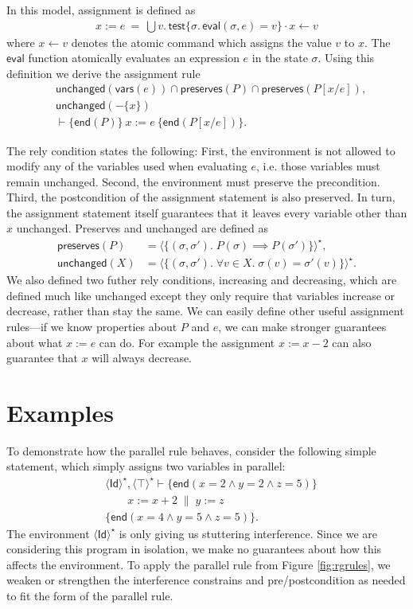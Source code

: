 \documentclass{llncs}
\newcommand{\test}{\mathsf{test}}
\newcommand{\eval}{\mathsf{eval}}
\newcommand{\Id}{\mathsf{Id}}
\newcommand{\edn}{\mathsf{end}}
\newcommand{\unchanged}{\mathsf{unchanged}}
\newcommand{\preserves}{\mathsf{preserves}}
\begin{document}
In this model, assignment is defined as
\begin{align*}
  x := e \ =\ \bigcup v.\,\test\{\sigma.\,\eval(\sigma,e) = v\} \cdot x \leftarrow v
\end{align*}
where $x \leftarrow v$ denotes the atomic command which assigns the
value $v$ to $x$. The $\eval$ function atomically evaluates an expression $e$ in
the state $\sigma$. Using this definition we derive the assignment
rule
\begin{align*}
&\unchanged(\mathsf{vars}(e)) \cap \preserves(P) \cap \preserves(P[x/e]),\\
&\unchanged(- \{x\})\\
&\vdash \{\edn(P)\}\ x := e\ \{\edn(P[x/e])\}.
\end{align*}

The rely condition states the following: First, the environment is not
allowed to modify any of the variables used when evaluating $e$,
i.e. those variables must remain unchanged. Second, the
environment must preserve the precondition. Third, the postcondition
of the assignment statement is also preserved. In turn, the assignment
statement itself guarantees that it leaves every variable other than
$x$ unchanged. Preserves and unchanged are defined as
\begin{align*}
\preserves(P) &= \langle \{(\sigma,\sigma').\; P(\sigma) \implies P(\sigma')\}\rangle^\star,\\
\unchanged(X) &= \langle \{(\sigma,\sigma').\; \forall v\in X.\; \sigma(v) = \sigma'(v)\}\rangle^\star.
\end{align*}
We also defined two futher rely conditions, increasing and decreasing,
which are defined much like unchanged except they only require that
variables increase or decrease, rather than stay the same. We can
easily define other useful assignment rules---if we know properties about
$P$ and $e$, we can make stronger guarantees about what $x := e$ can
do. For example the assignment $x := x - 2$ can also guarantee that
$x$ will always decrease.

\section{Examples}
\label{sec:Examples}

To demonstrate how the parallel rule behaves, consider the following
simple statement, which simply assigns two variables in parallel:
\begin{align*}
&\langle\Id\rangle^\star, \langle\top\rangle^\star \vdash \{\edn(x = 2 \land y = 2 \land z = 5)\}\\
&\qquad x := x + 2 \;\|\; y := z\\
&\{\edn (x = 4 \land y = 5 \land z = 5)\}.
\end{align*}
The environment $\langle\Id\rangle^\star$ is only giving us stuttering
interference. Since we are considering this program in isolation, we
make no guarantees about how this affects the environment. To apply
the parallel rule from Figure \ref{fig:rgrules}, we weaken or
strengthen the interference constrains and pre/postcondition as needed
to fit the form of the parallel rule.
\end{document}
